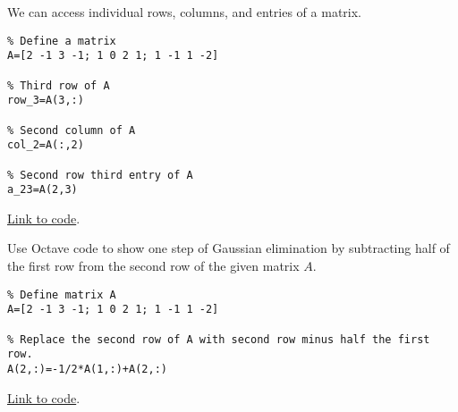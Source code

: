 \documentclass{ximera}
\begin{document}
\begin{template}\label{temp:matrixRowColEntry}
    We can access individual rows, columns, and entries of a matrix.
\begin{verbatim}
% Define a matrix 
A=[2 -1 3 -1; 1 0 2 1; 1 -1 1 -2]

% Third row of A
row_3=A(3,:)

% Second column of A
col_2=A(:,2)

% Second row third entry of A
a_23=A(2,3)   
\end{verbatim}
\href{https://sagecell.sagemath.org/?z=eJxVjEEKwjAURPeB3GE2BQsR7M-u0kXAG9SdSAhtigGbQIhYb-9v7cbNMDM8XoWLn0L0cJhdyWGBFKa7EY4NNMcZDU4gbIU_DrpLIUWF6yPkETm9kSYYKbhZ3ZmDVm39I3o_pDhiSM_XHHeKhyWmWkX_1Coqm9LHkj877iytTlK6_gIqSCuZ&lang=octave&interacts=eJyLjgUAARUAuQ==}{Link to code}.
\end{template}

\begin{example}\label{ex:gauss_octave}
Use Octave code to show one step of Gaussian elimination by subtracting half of the first row from the second row of the given matrix $A$.
\begin{verbatim}
% Define matrix A
A=[2 -1 3 -1; 1 0 2 1; 1 -1 1 -2] 

% Replace the second row of A with second row minus half the first row.  
A(2,:)=-1/2*A(1,:)+A(2,:)  
\end{verbatim}

\href{https://sagecell.sagemath.org/?z=eJxNjMsKwjAURPeB_MNsCvVRNXGndHHBL3ArLkK9IYE2kSRSP99YN26Gw5lhGlzY-sCYTEn-DZKC-ptGp3CscYbCARoLVFdD3yGFFA2u_BzNwCiOkXmI4YEUZ0QLwuyL-5eTD68MZ0a7zK1PuXyLHeoZtXp7WvWd2us1tary5qc-770qUw==&lang=octave&interacts=eJyLjgUAARUAuQ==}{Link to code}.
\end{example}
\end{document}
